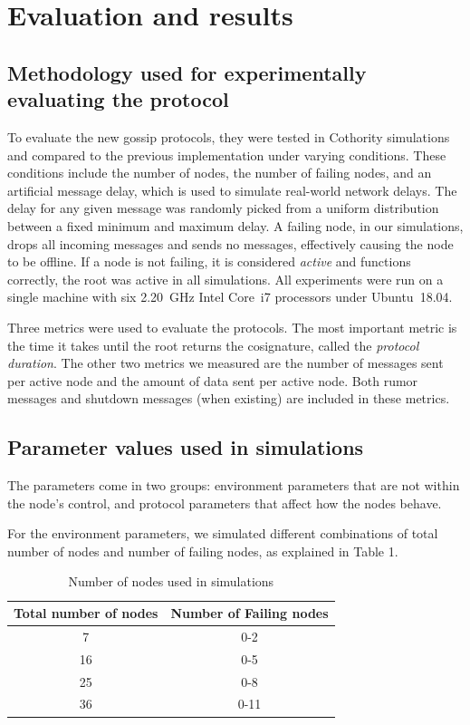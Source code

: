 \section{Evaluation and results}
\label{evares}

\subsection{Methodology used for experimentally evaluating the protocol}

To evaluate the new gossip protocols, they were tested in Cothority simulations and compared to the previous implementation under varying conditions.
These conditions include the number of nodes, the number of failing nodes, and an artificial message delay, which is used to simulate real-world network delays.
The delay for any given message was randomly picked from a uniform distribution between a fixed minimum and maximum delay.
A failing node, in our simulations, drops all incoming messages and sends no messages, effectively causing the node to be offline.
If a node is not failing, it is considered \emph{active} and functions correctly, the root was active in all simulations.
All experiments were run on a single machine with six 2.20~GHz Intel Core~i7 processors under Ubuntu~18.04.

Three metrics were used to evaluate the protocols.
The most important metric is the time it takes until the root returns the cosignature, called the \emph{protocol duration}.
The other two metrics we measured are the number of messages sent per active node and the amount of data sent per active node.
Both rumor messages and shutdown messages (when existing) are included in these metrics.


\subsection{Parameter values used in simulations}
\label{defaults}

The parameters come in two groups: environment parameters that are not within the node's control, and protocol parameters that affect how the nodes behave.

For the environment parameters, we simulated different combinations of total number of nodes and number of failing nodes, as explained in Table 1.

\begin{table}[]
  \caption{Number of nodes used in simulations}
\centering
\begin{tabular}{|c|c|}
\hline
Total number of nodes & Number of Failing nodes   \\ \hline
7                     & 0-2     \\ \hline
16                    & 0-5    \\ \hline
25                    & 0-8    \\ \hline
36                    & 0-11  \\ \hline
\end{tabular}
\end{table}

